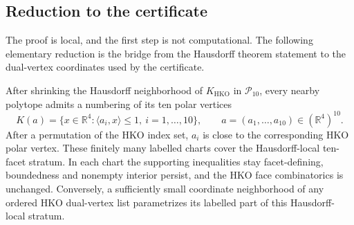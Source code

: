 \clearpage
\subsection{Reduction to the certificate}
\label{subsec:hko-local-maximum-decision-problem}

The proof is local, and the first step is not computational. The following
elementary reduction is the bridge from the Hausdorff theorem statement to the
dual-vertex coordinates used by the certificate.

\begin{lemma}
\label{lem:hko-hausdorff-local-ten-facet-chart}
After shrinking the Hausdorff neighborhood of \(K_{\mathrm{HKO}}\) in
\(\mathcal P_{10}\), every nearby polytope admits a numbering of its ten polar
vertices
\[
  K(a)=
  \{x\in\mathbb R^4:\langle a_i,x\rangle\le 1,\ i=1,\ldots,10\},
  \qquad
  a=(a_1,\ldots,a_{10})\in(\mathbb R^4)^{10}.
\]
After a permutation of the HKO index set, \(a_i\) is close to the corresponding
HKO polar vertex. These finitely many labelled charts cover the Hausdorff-local
ten-facet stratum. In each chart the supporting inequalities stay
facet-defining, boundedness and nonempty interior persist, and the HKO face
combinatorics is unchanged. Conversely, a sufficiently small coordinate
neighborhood of any ordered HKO dual-vertex list parametrizes its labelled part
of this Hausdorff-local stratum.
\end{lemma}


